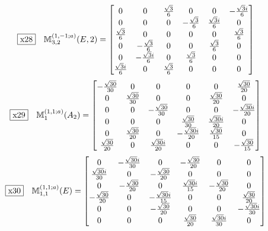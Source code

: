 \documentclass[fleqn,10pt,landscape]{jsarticle}
\begin{document}
\begin{dmath*}
\fbox{x28}\quad \mathbb{M}_{3,2}^{(1,-1;a)}(E,2)=\begin{bmatrix} 0 & 0 & \frac{\sqrt{3}}{6} & 0 & 0 & - \frac{\sqrt{3} i}{6} \\ 0 & 0 & 0 & - \frac{\sqrt{3}}{6} & \frac{\sqrt{3} i}{6} & 0 \\ \frac{\sqrt{3}}{6} & 0 & 0 & 0 & 0 & \frac{\sqrt{3}}{6} \\ 0 & - \frac{\sqrt{3}}{6} & 0 & 0 & \frac{\sqrt{3}}{6} & 0 \\ 0 & - \frac{\sqrt{3} i}{6} & 0 & \frac{\sqrt{3}}{6} & 0 & 0 \\ \frac{\sqrt{3} i}{6} & 0 & \frac{\sqrt{3}}{6} & 0 & 0 & 0 \end{bmatrix}
\end{dmath*}
\begin{dmath*}
\fbox{x29}\quad \mathbb{M}_{1}^{(1,1;a)}(A_{2})=\begin{bmatrix} - \frac{\sqrt{30}}{30} & 0 & 0 & 0 & 0 & \frac{\sqrt{30}}{20} \\ 0 & \frac{\sqrt{30}}{30} & 0 & 0 & \frac{\sqrt{30}}{20} & 0 \\ 0 & 0 & - \frac{\sqrt{30}}{30} & 0 & 0 & - \frac{\sqrt{30} i}{20} \\ 0 & 0 & 0 & \frac{\sqrt{30}}{30} & \frac{\sqrt{30} i}{20} & 0 \\ 0 & \frac{\sqrt{30}}{20} & 0 & - \frac{\sqrt{30} i}{20} & \frac{\sqrt{30}}{15} & 0 \\ \frac{\sqrt{30}}{20} & 0 & \frac{\sqrt{30} i}{20} & 0 & 0 & - \frac{\sqrt{30}}{15} \end{bmatrix}
\end{dmath*}
\begin{dmath*}
\fbox{x30}\quad \mathbb{M}_{1,1}^{(1,1;a)}(E)=\begin{bmatrix} 0 & - \frac{\sqrt{30} i}{30} & 0 & - \frac{\sqrt{30}}{20} & 0 & 0 \\ \frac{\sqrt{30} i}{30} & 0 & - \frac{\sqrt{30}}{20} & 0 & 0 & 0 \\ 0 & - \frac{\sqrt{30}}{20} & 0 & \frac{\sqrt{30} i}{15} & - \frac{\sqrt{30}}{20} & 0 \\ - \frac{\sqrt{30}}{20} & 0 & - \frac{\sqrt{30} i}{15} & 0 & 0 & \frac{\sqrt{30}}{20} \\ 0 & 0 & - \frac{\sqrt{30}}{20} & 0 & 0 & - \frac{\sqrt{30} i}{30} \\ 0 & 0 & 0 & \frac{\sqrt{30}}{20} & \frac{\sqrt{30} i}{30} & 0 \end{bmatrix}
\end{dmath*}
\end{document}
